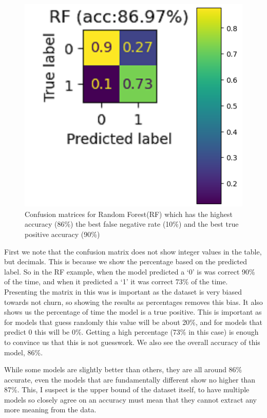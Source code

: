 \documentclass[]{article}
\newcommand{\winningaccuracy}{86\%\xspace}
\newcommand{\winningtpaccuracy}{90\%\xspace}
\newcommand{\winningfnrate}{10\%\xspace}
\newcommand{\winningmodelshort}{RF\xspace}
\newcommand{\winningmodellong}{Random Forest\xspace}
\newcommand{\winningtnrate}{73\%\xspace}
\begin{document}
\begin{figure}[h!]
	\centering
	\includegraphics[scale=1]{rf_cm}
	\caption{Confusion matrices  for \winningmodellong (\winningmodelshort) which has the highest accuracy (\winningaccuracy) the best false negative rate (\winningfnrate) and the best true positive accuracy (\winningtpaccuracy)}
\end{figure}

First we note that the confusion matrix does not show integer values in the table, but decimals. This is because we show the percentage based on the predicted label. So in the \winningmodelshort example, when the model predicted a ‘0’ is was correct \winningtpaccuracy of the time, and when it predicted a ‘1’ it was correct \winningtnrate of the time. Presenting the matrix in this was is important as the dataset is very biased towards not churn, so showing the results as percentages removes this bias. It also shows us the percentage of time the model is a true positive. This is important as for models that guess randomly this value will be about 20\%, and for models that predict 0 this will be 0\%. Getting a high percentage (\winningtnrate in this case) is enough to convince us that this is not guesswork. We also see the overall accuracy of this model, \winningaccuracy. 

While some models are slightly better than others, they are all around 86\% accurate, even the models that are fundamentally different show no higher than 87\%. This, I suspect is the upper bound of the dataset itself, to have multiple models so closely agree on an accuracy must mean that they cannot extract any more meaning from the data.
\end{document}
